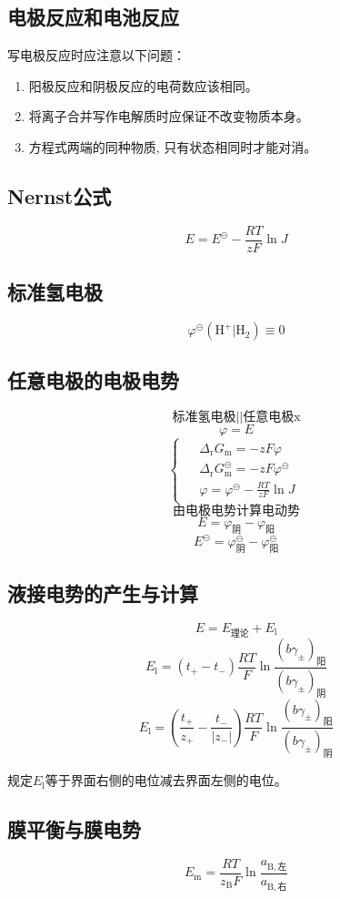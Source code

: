 \documentclass[twocolumn]{article}
\newcommand{\equ}[1]{\begin{equation*}#1\end{equation*}}
\newcommand{\drgm}{\Delta_{\mathrm{r}}G_{\rmm}}
\newcommand{\rmB}{\mathrm{B}}
\newcommand{\rmm}{\mathrm{m}}
\newcommand{\subB}{_{\rmB}}
\newcommand{\subm}{_{\rmm}}
\newcommand{\std}{^{\circleddash}}
\newcommand{\xkh}[1]{\left(#1\right)}
\begin{document}
\subsection{电极反应和电池反应}
写电极反应时应注意以下问题：
\begin{enumerate}
\item 阳极反应和阴极反应的电荷数应该相同。
\item 将离子合并写作电解质时应保证不改变物质本身。
\item 方程式两端的同种物质, 只有状态相同时才能对消。
\end{enumerate}
\subsection{Nernst公式}
\equ{E=E\std-\frac{RT}{zF}\ln J}
\subsection{标准氢电极}
\equ{\varphi\std\xkh{\mathrm{H}^{+}|\mathrm{H}_{2}}\equiv 0}
\subsection{任意电极的电极电势}
\equ{\text{标准氢电极}||\text{任意电极x}}
\equ{\varphi=E}
\equ{\begin{cases}\begin{aligned}
& \drgm=-zF\varphi\\
& \drgm\std=-zF\varphi\std\\
& \varphi=\varphi\std-\frac{RT}{zF}\ln J
\end{aligned}\end{cases}}
\equ{由电极电势计算电动势}
\equ{E=\varphi_{\text{阴}}-\varphi_{\text{阳}}}
\equ{E\std=\varphi_{\text{阴}}\std-\varphi_{\text{阳}}\std}
\subsection{液接电势的产生与计算}
\equ{E=E_{\text{理论}}+E_{\mathrm{l}}}
\equ{E_{\mathrm{l}}=\xkh{t_{+}-t_{-}}\frac{RT}{F}\ln \frac{\xkh{b\gamma_{\pm}}_{\text{阳}}}{\xkh{b\gamma_{\pm}}_{\text{阴}}}}
\equ{E_{\mathrm{l}}=\xkh{\frac{t_{+}}{z_{+}}-\frac{t_{-}}{|z_{-}|}}\frac{RT}{F}\ln \frac{\xkh{b\gamma_{\pm}}_{\text{阳}}}{\xkh{b\gamma_{\pm}}_{\text{阴}}}}

规定$E_{\mathrm{l}}$等于界面右侧的电位减去界面左侧的电位。
\subsection{膜平衡与膜电势}
\equ{E\subm=\frac{RT}{z\subB F}\ln \frac{a_{\mathrm{B}, \text{左}}}{a_{\mathrm{B}, \text{右}}}}
\end{document}
